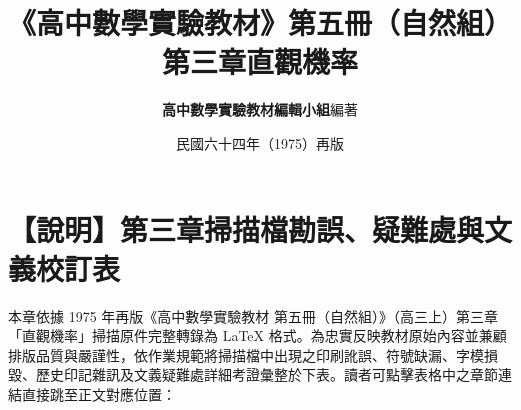 \documentclass[a4paper,12pt,twoside]{article}
\title{\LARGE\textbf{《高中數學實驗教材》第五冊（自然組）}\\[0.5em] \Large\textbf{第三章\quad 直觀機率}}
\author{\textbf{高中數學實驗教材編輯小組}\quad 編著}
\date{民國六十四年（1975）再版}
\begin{document}
\maketitle
\thispagestyle{firstpage}

\section*{【說明】第三章掃描檔勘誤、疑難處與文義校訂表}
\label{sec:errata_notes_b5_ch3}

本章依據 1975 年再版《高中數學實驗教材 第五冊（自然組）》（高三上）第三章「直觀機率」掃描原件完整轉錄為 \LaTeX{} 格式。為忠實反映教材原始內容並兼顧排版品質與嚴謹性，依作業規範將掃描檔中出現之印刷訛誤、符號缺漏、字模損毀、歷史印記雜訊及文義疑難處詳細考證彙整於下表。讀者可點擊表格中之章節連結直接跳至正文對應位置：
\end{document}
